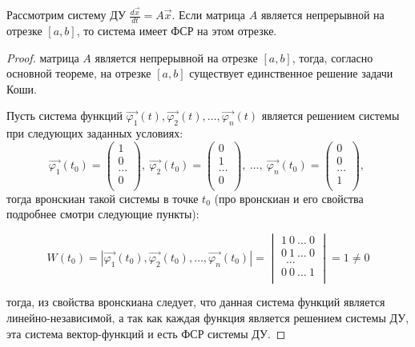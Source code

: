 \begin{theorem}
    Рассмотрим систему ДУ $\frac{d \vec x}{dt} = A \vec x$. Если матрица $A$ является непрерывной на отрезке $[a, b]$, то система
    имеет ФСР на этом отрезке.
\end{theorem}
\begin{proof}
    матрица $A$ является непрерывной на отрезке $[a, b]$, тогда, согласно основной теореме, на отрезке $[a, b]$ существует единственное решение задачи Коши.
    
    Пусть система функций $\vec{\varphi_1}(t), \vec{\varphi_2}(t), \dots, \vec{\varphi_n}(t)$ является решением системы при следующих заданных условиях:
    \begin{equation}
        \vec{\varphi_1}(t_0) = 
        \begin{pmatrix}
            1 \\
            0 \\
            \dots \\
            0 \\
        \end{pmatrix}, ~
        \vec{\varphi_2}(t_0) = 
        \begin{pmatrix}
        0 \\
        1 \\
        \dots \\
        0 \\
        \end{pmatrix}, ~
        \dots, ~
        \vec{\varphi_n}(t_0) = 
        \begin{pmatrix}
        0 \\
        0 \\
        \dots \\
        1 \\
        \end{pmatrix}, ~
    \end{equation}
    тогда вронскиан такой системы в точке $t_0$ (про вронскиан и его свойства подробнее смотри следующие пункты):
    
    \begin{equation}
    W(t_0) = |\vec{\varphi_1}(t_0), \vec{\varphi_2}(t_0), \dots, \vec{\varphi_n}(t_0)| =
    \begin{vmatrix}
        1 ~ 0 ~ \dots ~ 0 \\
        0 ~ 1 ~ \dots ~ 0 \\
            ~~  \dots     \\
        0 ~ 0 ~ \dots ~ 1 \\
    \end{vmatrix} = 1 \neq 0
    \end{equation}
    
    тогда, из свойства вронскиана следует, что данная система функций является линейно-независимой, а так как каждая функция является решением системы ДУ, эта система вектор-функций и есть ФСР системы ДУ.
\end{proof}

